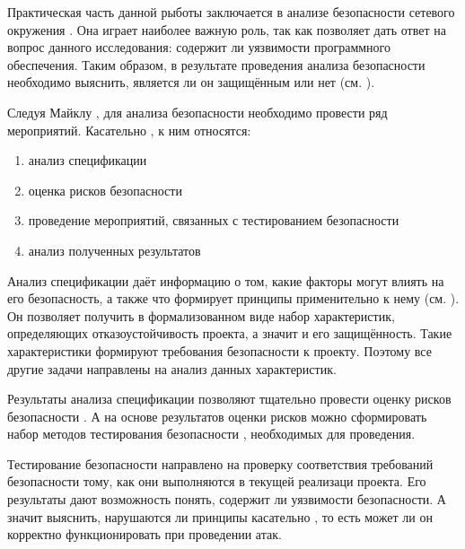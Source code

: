 %
Практическая часть данной рыботы заключается в анализе безопасности сетевого окружения . 
%
Она играет наиболее важную роль, так как позволяет дать ответ на вопрос данного исследования: содержит ли  уязвимости программного обеспечения. 
%
Таким образом, в результате проведения анализа безопасности  необходимо выяснить, является ли он защищённым  или нет (см. ). 

%
Следуя Майклу , для анализа безопасности  необходимо провести ряд мероприятий. 
%
Касательно , к ним относятся:
\begin{enumerate}
	\leftskip2em%
	\setlength{\itemsep}{0pt}%
	\setlength{\parsep}{0pt}%

	\item анализ спецификации
	\item оценка рисков безопасности
	\item проведение мероприятий, связанных с тестированием безопасности
	\item анализ полученных результатов
\end{enumerate} 

%
%
%

%
Анализ спецификации  даёт информацию о том, какие факторы могут влиять на его безопасность, а также что формирует принципы  применительно к нему (см. ). 
%
Он позволяет получить в формализованном виде набор характеристик, определяющих отказоустойчивость проекта, а значит и его защищённость. 
%
Такие характеристики формируют требования безопасности к проекту. 
%
Поэтому все другие задачи направлены на анализ данных характеристик. 

%
Результаты анализа спецификации позволяют тщательно провести оценку рисков безопасности . 
%
А на основе результатов оценки рисков можно сформировать набор методов тестирования безопасности , необходимых для проведения. 

%
Тестирование безопасности  направлено на проверку соответствия требований безопасности тому, как они выполняются в текущей реализаци проекта. 
%
Его результаты дают возможность понять, содержит ли  уязвимости безопасности. 
%
А значит выяснить, нарушаются ли принципы  касательно , то есть может ли он корректно функционировать при проведении атак.